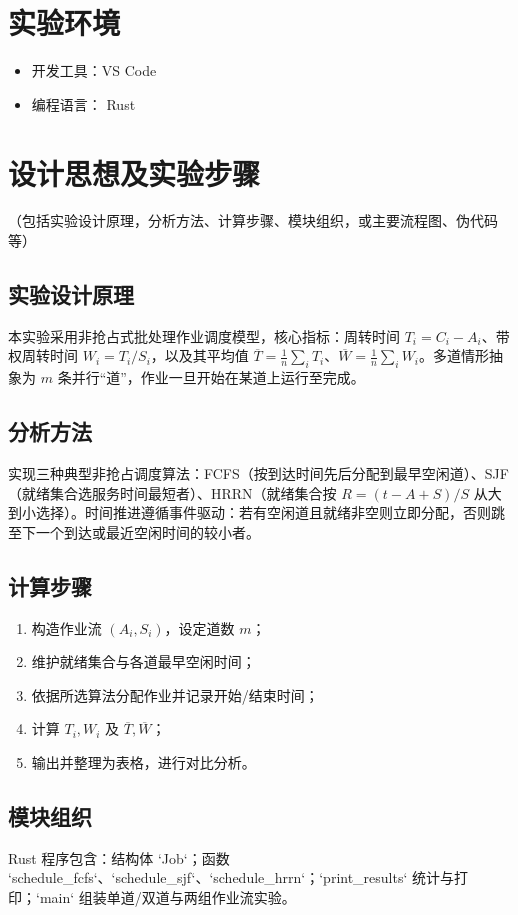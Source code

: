 \documentclass[12pt,hyperref,a4paper,UTF8]{ctexart}
\begin{document}
\section{实验环境}
    \begin{itemize}
        \item 开发工具：VS Code
        \item 编程语言： Rust
    \end{itemize}

\section{设计思想及实验步骤}
（包括实验设计原理，分析方法、计算步骤、模块组织，或主要流程图、伪代码等）

\subsection{实验设计原理}
本实验采用非抢占式批处理作业调度模型，核心指标：周转时间 \(T_i=C_i-A_i\)、带权周转时间 \(W_i=T_i/S_i\)，以及其平均值 \(\overline{T}=\frac{1}{n}\sum_i T_i\)、\(\overline{W}=\frac{1}{n}\sum_i W_i\)。多道情形抽象为 \(m\) 条并行“道”，作业一旦开始在某道上运行至完成。

\subsection{分析方法}
实现三种典型非抢占调度算法：FCFS（按到达时间先后分配到最早空闲道）、SJF（就绪集合选服务时间最短者）、HRRN（就绪集合按 \(R=(t-A+S)/S\) 从大到小选择）。时间推进遵循事件驱动：若有空闲道且就绪非空则立即分配，否则跳至下一个到达或最近空闲时间的较小者。

\subsection{计算步骤}
\begin{enumerate}
    \item 构造作业流 \((A_i,S_i)\)，设定道数 \(m\)；
    \item 维护就绪集合与各道最早空闲时间；
    \item 依据所选算法分配作业并记录开始/结束时间；
    \item 计算 \(T_i, W_i\) 及 \(\overline{T}, \overline{W}\)；
    \item 输出并整理为表格，进行对比分析。
\end{enumerate}

\subsection{模块组织}
Rust 程序包含：结构体 `Job`；函数 `schedule\_fcfs`、`schedule\_sjf`、`schedule\_hrrn`；`print\_results` 统计与打印；`main` 组装单道/双道与两组作业流实验。
\end{document}
